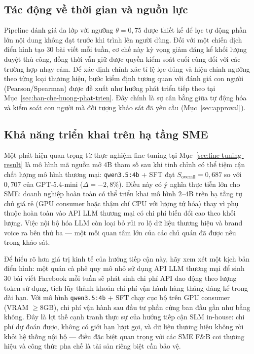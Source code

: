 \subsection{Tác động về thời gian và nguồn lực}

Pipeline đánh giá đa lớp với ngưỡng $\theta = 0{,}75$ được thiết kế
để lọc tự động phần lớn nội dung không đạt trước khi trình lên người
dùng. Đối với một chiến dịch điển hình tạo $30$ bài viết mỗi tuần, cơ
chế này kỳ vọng giảm đáng kể khối lượng duyệt thủ công, đồng thời
vẫn giữ được quyền kiểm soát cuối cùng đối với các trường hợp nhạy
cảm. Để xác định chính xác tỉ lệ lọc đúng và hiệu chỉnh ngưỡng theo
từng loại thương hiệu, bước kiểm định tương quan với đánh giá con
người (Pearson/Spearman) được đề xuất như hướng phát triển tiếp theo
tại Mục~\ref{sec:han-che-huong-phat-trien}. Đây chính là sự cân bằng
giữa tự động hóa và kiểm soát con người mà đối tượng khảo sát đã yêu
cầu (Mục~\ref{sec:approval}).

\subsection{Khả năng triển khai trên hạ tầng SME}

Một phát hiện quan trọng từ thực nghiệm fine-tuning tại
Mục~\ref{sec:fine-tuning-result} là mô hình mã nguồn mở $4$B tham số
sau khi tinh chỉnh có thể tiệm cận chất lượng mô hình thương mại:
\texttt{qwen3.5:4b} + SFT đạt $S_{\text{overall}} = 0{,}687$ so với
$0{,}707$ của GPT-5.4-mini ($\Delta = -2{,}8\%$). Điều này có ý nghĩa
thực tiễn lớn cho SME: doanh nghiệp hoàn toàn có thể triển khai mô
hình $2$--$4$B trên hạ tầng tự chủ giá rẻ (GPU consumer hoặc thậm
chí CPU với lượng tử hóa) thay vì phụ thuộc hoàn toàn vào API LLM
thương mại có chi phí biến đổi cao theo khối lượng. Việc nội bộ hóa
LLM còn loại bỏ rủi ro lộ dữ liệu thương hiệu và brand voice ra bên
thứ ba --- một mối quan tâm lớn của các chủ quán đã được nêu trong
khảo sát.

Để hiểu rõ hơn giá trị kinh tế của hướng tiếp cận này, hãy xem xét
một kịch bản điển hình: một quán cà phê quy mô nhỏ sử dụng API LLM
thương mại để sinh $30$ bài viết Facebook mỗi tuần sẽ phát sinh chi
phí API dao động theo lượng token sử dụng, tích lũy thành khoản chi
phí vận hành hàng tháng đáng kể trong dài hạn. Với mô hình
\texttt{qwen3.5:4b} + SFT chạy cục bộ trên GPU consumer (VRAM
$\geq 8$GB), chi phí vận hành sau đầu tư phần cứng ban đầu gần như
bằng không. Đây là lợi thế cạnh tranh thực sự của hướng tiếp cận SLM
in-house: chi phí dự đoán được, không có giới hạn lượt gọi, và dữ liệu
thương hiệu không rời khỏi hệ thống nội bộ --- điều đặc biệt quan trọng
với các SME F\&B coi thương hiệu và công thức pha chế là tài sản riêng
biệt cần bảo vệ.

